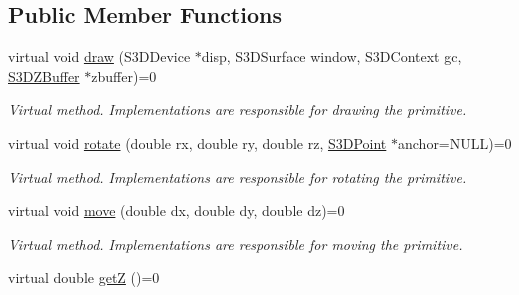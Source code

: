 \subsection*{Public Member Functions}
\begin{DoxyCompactItemize}
\item 
\hypertarget{class_s3_d_primitive_a857f042bc63ae6233b63b60089e92b81}{
virtual void \hyperlink{class_s3_d_primitive_a857f042bc63ae6233b63b60089e92b81}{draw} (S3DDevice $\ast$disp, S3DSurface window, S3DContext gc, \hyperlink{class_s3_d_z_buffer}{S3DZBuffer} $\ast$zbuffer)=0}
\label{class_s3_d_primitive_a857f042bc63ae6233b63b60089e92b81}

\begin{DoxyCompactList}\small\item\em Virtual method. Implementations are responsible for drawing the primitive. \item\end{DoxyCompactList}\item 
\hypertarget{class_s3_d_primitive_a23eb36b6bd48643e8f7be4b950592d9e}{
virtual void \hyperlink{class_s3_d_primitive_a23eb36b6bd48643e8f7be4b950592d9e}{rotate} (double rx, double ry, double rz, \hyperlink{class_s3_d_point}{S3DPoint} $\ast$anchor=NULL)=0}
\label{class_s3_d_primitive_a23eb36b6bd48643e8f7be4b950592d9e}

\begin{DoxyCompactList}\small\item\em Virtual method. Implementations are responsible for rotating the primitive. \item\end{DoxyCompactList}\item 
\hypertarget{class_s3_d_primitive_a73a178ec2e1aa8e95f01baf0552724a9}{
virtual void \hyperlink{class_s3_d_primitive_a73a178ec2e1aa8e95f01baf0552724a9}{move} (double dx, double dy, double dz)=0}
\label{class_s3_d_primitive_a73a178ec2e1aa8e95f01baf0552724a9}

\begin{DoxyCompactList}\small\item\em Virtual method. Implementations are responsible for moving the primitive. \item\end{DoxyCompactList}\item 
\hypertarget{class_s3_d_primitive_ab5b06d3a8e83216cc42554bb78afd2d9}{
virtual double \hyperlink{class_s3_d_primitive_ab5b06d3a8e83216cc42554bb78afd2d9}{getZ} ()=0}
\label{class_s3_d_primitive_ab5b06d3a8e83216cc42554bb78afd2d9}


\end{DoxyCompactItemize}
